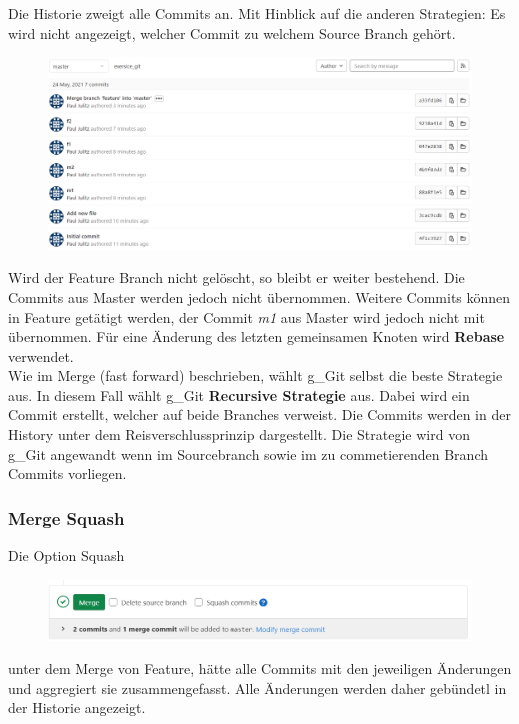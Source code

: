 Die Historie zweigt alle Commits an. Mit Hinblick auf die anderen Strategien: Es wird nicht angezeigt, welcher Commit zu welchem Source Branch gehört.
\begin{figure}[H]
	\centering
	\includegraphics[width=0.7\linewidth]{attachment/chapter_5/Scc025}
\end{figure}

Wird der Feature Branch nicht gelöscht, so bleibt er weiter bestehend. Die Commits aus Master werden jedoch nicht übernommen. Weitere Commits können in Feature getätigt werden, der Commit \textit{m1} aus Master wird jedoch nicht mit übernommen. Für eine Änderung des letzten gemeinsamen Knoten wird \textbf{Rebase} verwendet.\\

Wie im Merge (fast forward) beschrieben, wählt \gls{g_Git} selbst die beste Strategie aus. In diesem Fall wählt \gls{g_Git} \textbf{Recursive Strategie} aus. Dabei wird ein Commit erstellt, welcher auf beide Branches verweist. Die Commits werden in der History unter dem Reisverschlussprinzip dargestellt. Die Strategie wird von \gls{g_Git} angewandt wenn im Sourcebranch sowie im zu commetierenden Branch Commits vorliegen.

\subsubsection{Merge Squash}
Die Option Squash 
\begin{figure}[H]
	\centering
	\includegraphics[width=0.7\linewidth]{attachment/chapter_5/Scc020}
\end{figure}
unter dem Merge von Feature, hätte alle Commits mit den jeweiligen Änderungen und aggregiert sie zusammengefasst. Alle Änderungen werden daher gebündetl in der Historie angezeigt.\\

